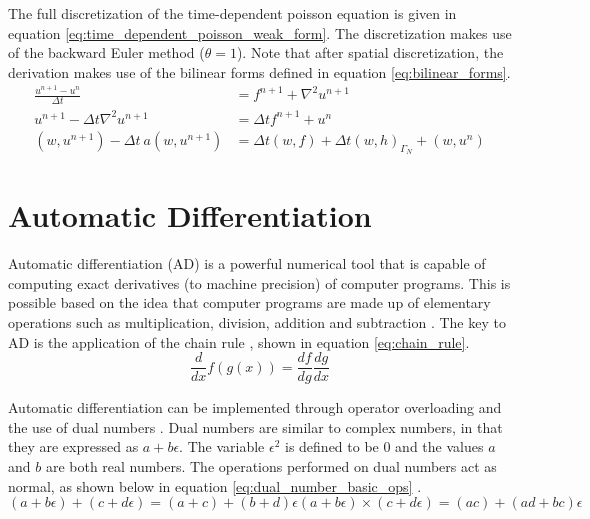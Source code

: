 The full discretization of the time-dependent poisson equation is given in equation \ref{eq:time_dependent_poisson_weak_form}. The discretization makes use of the backward Euler method ($\theta = 1$). Note that after spatial discretization, the derivation makes use of the bilinear forms defined in equation \ref{eq:bilinear_forms}.
\begin{equation}
	\begin{split}
		\frac{u^{n+1}-u^n}{\Delta t} &= f^{n+1}+\nabla^2 u^{n+1} \\
		u^{n+1}-\Delta t \nabla^2 u^{n+1} &= \Delta t f^{n+1}+u^n \\
		(w,u^{n+1}) -\Delta t \ a(w,u^{n+1}) &=\Delta t(w,f) +\Delta t(w,h)_{\Gamma_N}+ (w,u^n)
	\end{split}
	\label{eq:time_dependent_poisson_weak_form}
\end{equation}


\section{Automatic Differentiation}
\label{chap:auto_diff}
Automatic differentiation (AD) is a powerful numerical tool that is capable of computing exact derivatives (to machine precision) of computer programs. This is possible based on the idea that computer programs are made up of elementary operations such as multiplication, division, addition and subtraction \cite{Kochenderfer_Wheeler_2019}. The key to AD is the application of the chain rule \cite{Kochenderfer_Wheeler_2019}, shown in equation \ref{eq:chain_rule}.
\begin{equation}
	\frac{d}{dx}f(g(x)) = \frac{df}{dg}\frac{dg}{dx}
	\label{eq:chain_rule}
\end{equation}

Automatic differentiation can be implemented through operator overloading and the use of dual numbers \cite{Kochenderfer_Wheeler_2019}. Dual numbers are similar to complex numbers, in that they are expressed as $a + b\epsilon $. The variable $\epsilon^2$ is defined to be 0 and the values $a$ and $b$ are both real numbers. The operations performed on dual numbers act as normal, as shown below in equation \ref{eq:dual_number_basic_ops} \cite{Kochenderfer_Wheeler_2019}.
\begin{subequations}
	\begin{equation}
		(a + b\epsilon) + (c + d\epsilon) = (a + c) + (b + d)\epsilon
		\label{eq:dual_number_addition}
	\end{equation}
	\begin{equation}
		(a + b\epsilon) \times (c + d\epsilon) = (ac) + (ad + bc)\epsilon
		\label{eq:dual_number_multiplication}
	\end{equation}
	\label{eq:dual_number_basic_ops}
\end{subequations}


